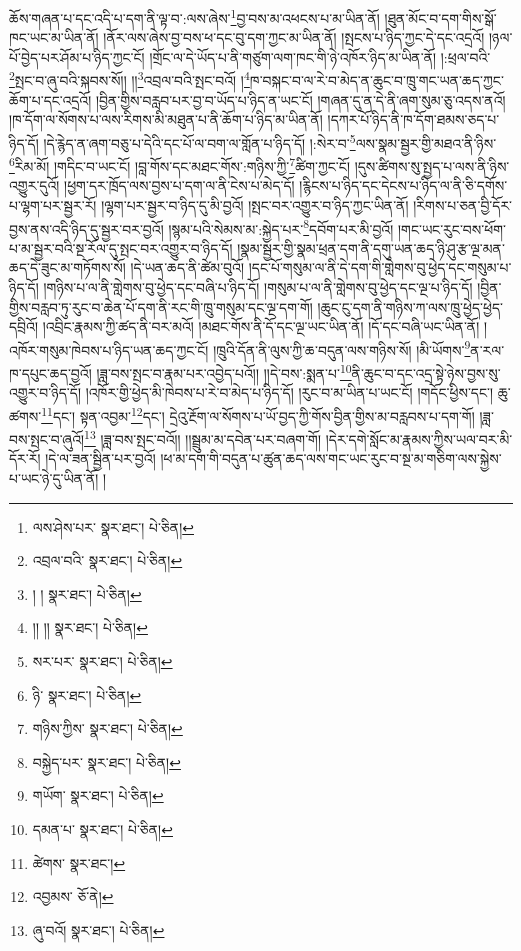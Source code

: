 ཆོས་གཞན་པ་དང་འདི་པ་དག་ནི་ལྟ་བ་:ལས་ཞེས་\footnote{ལས་ཤེས་པར་  སྣར་ཐང་།  པེ་ཅིན། }བྱ་བས་མ་འཕངས་པ་མ་ཡིན་ནོ། །ཐུན་མོང་བ་དག་གིས་སྒོ་ཁང་ཡང་མ་ཡིན་ནོ། །ནོར་ལས་ཞེས་བྱ་བས་ཕ་དང་བུ་དག་ཀྱང་མ་ཡིན་ནོ། །སྤངས་པ་ཉིད་ཀྱང་དེ་དང་འདྲའོ། །ཉལ་པོ་བྱེད་པར་ཤོམ་པ་ཉིད་ཀྱང་ངོ། །གྲོང་ལ་དེ་ཡོད་པ་ནི་གཙུག་ལག་ཁང་གི་ཉེ་འཁོར་ཉིད་མ་ཡིན་ནོ། །:ཕྲལ་བའི་\footnote{འབྲལ་བའི་  སྣར་ཐང་།  པེ་ཅིན། }སྤང་བ་ཞུ་བའི་སྐབས་སོ།། །།\footnote{། །  སྣར་ཐང་།  པེ་ཅིན། }འབྲལ་བའི་སྤང་བའོ། །\footnote{།། །།  སྣར་ཐང་།  པེ་ཅིན། }ཁ་བསྐང་བ་ལ་རེ་བ་མེད་ན་ཆུང་བ་ཁྲུ་གང་ཡན་ཆད་ཀྱང་ཆོག་པ་དང་འདྲའོ། །བྱིན་གྱིས་བརླབ་པར་བྱ་བ་ཡོད་པ་ཉིད་ན་ཡང་ངོ། །གཞན་དུ་ན་དེ་ནི་ཞག་སུམ་ཅུ་འདས་ནའོ། །ཁ་དོག་ལ་སོགས་པ་ལས་རིགས་མི་མཐུན་པ་ནི་ཆོག་པ་ཉིད་མ་ཡིན་ནོ། །དཀར་པོ་ཉིད་ནི་ཁ་དོག་ཐམས་ཅད་པ་ཉིད་དོ། །དེ་རྙེད་ན་ཞག་བཅུ་པ་དེའི་དང་པོ་ལ་བག་ལ་གློན་པ་ཉིད་དོ། །:སེར་བ་\footnote{སར་པར་  སྣར་ཐང་།  པེ་ཅིན། }ལས་སྣམ་སྦྱར་གྱི་མཐའ་ནི་ཉིས་\footnote{ཉི་  སྣར་ཐང་།  པེ་ཅིན། }རིམ་མོ། །གདིང་བ་ཡང་ངོ། །བླ་གོས་དང་མཐང་གོས་:གཉིས་ཀྱི་\footnote{གཉིས་ཀྱིས་  སྣར་ཐང་།  པེ་ཅིན། }ཚིག་ཀྱང་ངོ། །དུས་ཚིགས་སུ་སྤྱད་པ་ལས་ནི་ཉིས་འགྱུར་དུའོ། །ཕྱག་དར་ཁྲོད་ལས་བྱས་པ་དག་ལ་ནི་ངེས་པ་མེད་དོ། །རྙིངས་པ་ཉིད་དང་དེངས་པ་ཉིད་ལ་ནི་ཅི་དགོས་པ་ལྷག་པར་སྦྱར་རོ། །ལྷག་པར་སྦྱར་བ་ཉིད་དུ་མི་བྱའོ། །སྤང་བར་འགྱུར་བ་ཉིད་ཀྱང་ཡིན་ནོ། །རིགས་པ་ཅན་བྱི་དོར་བྱས་ནས་འདི་ཉིད་དུ་སྦྱར་བར་བྱའོ། །སྙམ་པའི་སེམས་མ་:སྐྱེད་པར་\footnote{བསྐྱེད་པར་  སྣར་ཐང་།  པེ་ཅིན། }དབོག་པར་མི་བྱའོ། །གང་ཡང་རུང་བས་ཕོག་པ་མ་སྦྱར་བའི་སྔ་རོལ་དུ་སྤང་བར་འགྱུར་བ་ཉིད་དོ། །སྣམ་སྦྱར་གྱི་སྣམ་ཕྲན་དག་ནི་དགུ་ཡན་ཆད་ཉི་ཤུ་རྩ་ལྔ་མན་ཆད་དེ་ཟུང་མ་གཏོགས་སོ། །དེ་ཡན་ཆད་ནི་ཚེམ་བུའོ། །དང་པོ་གསུམ་ལ་ནི་དེ་དག་གི་གླེགས་བུ་ཕྱེད་དང་གསུམ་པ་ཉིད་དོ། །གཉིས་པ་ལ་ནི་གླེགས་བུ་ཕྱེད་དང་བཞི་པ་ཉིད་དོ། །གསུམ་པ་ལ་ནི་གླེགས་བུ་ཕྱེད་དང་ལྔ་པ་ཉིད་དོ། །བྱིན་གྱིས་བརླབ་ཏུ་རུང་བ་ཆེན་པོ་དག་ནི་རང་གི་ཁྲུ་གསུམ་དང་ལྔ་དག་གོ། །ཆུང་ངུ་དག་ནི་གཉིས་ཀ་ལས་ཁྲུ་ཕྱེད་ཕྱེད་དབྲིའོ། །འབྲིང་རྣམས་ཀྱི་ཚད་ནི་བར་མའོ། །མཐང་གོས་ནི་དོ་དང་ལྔ་ཡང་ཡིན་ནོ། །དོ་དང་བཞི་ཡང་ཡིན་ནོ། །འཁོར་གསུམ་ཁེབས་པ་ཉིད་ཡན་ཆད་ཀྱང་ངོ། །ཁྲུའི་དོན་ནི་ལུས་ཀྱི་ཆ་བདུན་ལས་གཉིས་སོ། །མི་ཡོགས་\footnote{གཡོག་  སྣར་ཐང་།  པེ་ཅིན། }ན་རལ་ཁ་དཔུང་ཆད་བྱའོ། །ཟླ་བས་སྤང་བ་རྣམ་པར་འབྱེད་པའོ།། །།དེ་བས་:སྨན་པ་\footnote{དམན་པ་  སྣར་ཐང་།  པེ་ཅིན། }ནི་ཆུང་བ་དང་འདྲ་སྟེ་ཉེས་བྱས་སུ་འགྱུར་བ་ཉིད་དོ། །འཁོར་གྱི་ཕྱེད་མི་ཁེབས་པ་རེ་བ་མེད་པ་ཉིད་དོ། །རུང་བ་མ་ཡིན་པ་ཡང་ངོ། །གདོང་ཕྱིས་དང་། ཆུ་ཚགས་\footnote{ཚེགས་  སྣར་ཐང་། }དང་། སྟན་འབྱམ་\footnote{འབྱམས་  ཅོ་ནེ། }དང་། དྲེའུ་རྔོག་ལ་སོགས་པ་ཡོ་བྱད་ཀྱི་གོས་བྱིན་གྱིས་མ་བརླབས་པ་དག་གོ། །ཟླ་བས་སྤང་བ་ཞུའོ།\footnote{ཞུ་བའོ།  སྣར་ཐང་།  པེ་ཅིན། } །ཟླ་བས་སྤང་བའོ།། །།སྦྲུམ་མ་དབེན་པར་བཞག་གོ། །དེར་དགེ་སློང་མ་རྣམས་ཀྱིས་ཡལ་བར་མི་དོར་རོ། །དེ་ལ་ཟན་སྦྱིན་པར་བྱའོ། །ཕ་མ་དག་གི་བདུན་པ་ཚུན་ཆད་ལས་གང་ཡང་རུང་བ་སྔ་མ་གཅིག་ལས་སྐྱེས་པ་ཡང་ཉེ་དུ་ཡིན་ནོ། །
